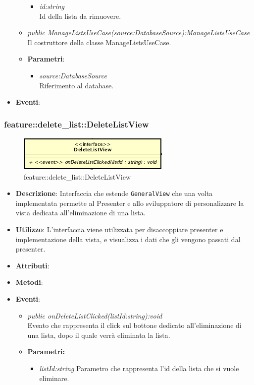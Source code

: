 \begin{itemize}
\begin{itemize}
{\begin{itemize}
			\item \textit{id:string}\\
			Id della lista da rimuovere.
			\end{itemize}}
	\item \textit{public ManageListsUseCase(source:DatabaseSource):ManageListsUseCase}\\
	Il costruttore della classe ManageListsUseCase.
		\item{\textbf{Parametri}: \begin{itemize}
			\item \textit{source:DatabaseSource}\\
						Riferimento al database.
			\end{itemize}}
	\end{itemize}
\item \textbf{Eventi}:
\end{itemize}

\subsubsection{feature::delete\_list::DeleteListView}

\label{feature::delete\_list::DeleteListView}
\begin{figure}[ht]
	\centering
	\includegraphics[scale=0.5]{Sezioni/SottosezioniST/img/app/DeleteListView.png}
	\caption{feature::delete\_list::DeleteListView}
\end{figure}

\begin{itemize}
\item \textbf{Descrizione}: Interfaccia che estende \texttt{GeneralView} che una volta implementata permette al Presenter e allo sviluppatore di personalizzare la vista dedicata all'eliminazione di una lista.
\item \textbf{Utilizzo}: L'interfaccia viene utilizzata per disaccoppiare presenter e implementazione della vista, e visualizza i dati che gli vengono passati dal presenter.
\item \textbf{Attributi}: 
\item \textbf{Metodi}:
\item \textbf{Eventi}:
	\begin{itemize}
	\item \textit{public onDeleteListClicked(listId:string):void}\\
	Evento che rappresenta il click sul bottone dedicato all'eliminazione di una lista, dopo il quale verrà eliminata la lista.
	\item{\textbf{Parametri:} \begin{itemize}
	\item \textit{listId:string}
	Parametro che rappresenta l'id della lista che si vuole eliminare.
	\end{itemize}}
	\end{itemize}
\end{itemize}

